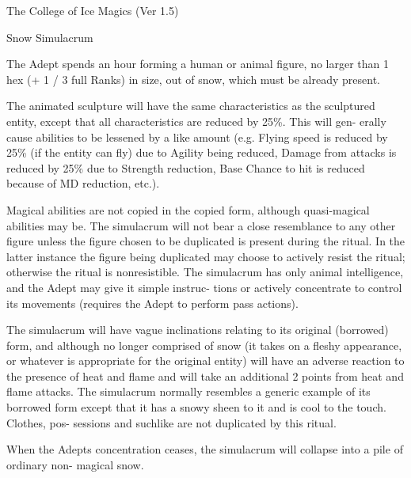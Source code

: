 \begin{Chapter}{The College of Ice Magics (Ver 1.5)}
\begin{ritual}[R-1]{Snow Simulacrum}
\begin{effects}
The Adept spends an hour forming a human or animal figure, no larger
than 1 hex (+ 1 / 3 full Ranks) in size, out of snow, which must be
already present.

The animated sculpture will have the same characteristics as the
sculptured entity, except that all characteristics are reduced by
25\%. This will gen- erally cause abilities to be lessened by a like
amount (e.g.  Flying speed is reduced by 25\% (if the entity can fly)
due to Agility being reduced, Damage from attacks is reduced by 25\%
due to Strength reduction, Base Chance to hit is reduced because of MD
reduction, etc.).

Magical abilities are not copied in the copied form, although
quasi-magical abilities may be. The simulacrum will not bear a close
resemblance to any other figure unless the figure chosen to be
duplicated is present during the ritual.  In the latter instance the
figure being duplicated may choose to actively resist the ritual;
otherwise the ritual is nonresistible.  The simulacrum has only animal
intelligence, and the Adept may give it simple instruc- tions or
actively concentrate to control its movements (requires the Adept to
perform pass actions).

The simulacrum will have vague inclinations relating to its original
(borrowed) form, and although no longer comprised of snow (it takes on
a fleshy appearance, or whatever is appropriate for the original
entity) will have an adverse reaction to the presence of heat and
flame and will take an additional 2 points from heat and flame
attacks.  The simulacrum normally resembles a generic example of its
borrowed form except that it has a snowy sheen to it and is cool to
the touch.  Clothes, pos- sessions and suchlike are not duplicated by
this ritual.

When the Adepts concentration ceases, the simulacrum will collapse
into a pile of ordinary non- magical snow.
\end{effects}
\end{ritual}



\end{Chapter}
